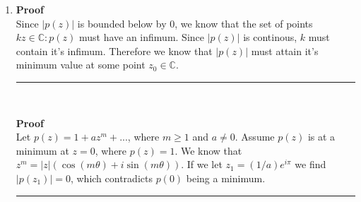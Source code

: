 \documentclass{article}%
\newcommand\abs[1]{\left|#1\right|}
\newenvironment{proof}[1][]{\begin{samepage}\textbf{Proof #1} \\ }{\\ \rule{0.5em}{0.5em} \end{samepage} \\}
\begin{document}
\begin{enumerate}
    \begin{proof}[$a_n = 1 + 1/2 + 1/3 + ... + 1/(n-1) - \ln{n}, n \geq 1$ is increasing]
        Let $n \geq 1$
        \begin{eqnarray*}
            a_n &=& 1 + 1/2 + 1/3 + ... 1/(n-1) - \ln{n} \\
                &=& \sum\limits_{i=1}^{n-1}\left(\frac{1}{i}\right)-\ln{n} \\
            a_{n+1}-a_{n} &=& \sum\limits_{i=1}^{n}\left(\frac{1}{i}\right)-\ln(n+1) - \sum\limits_{i=1}^{n-1}\left(\frac{1}{i}\right)+\ln(n) \\
                          &=& \frac{1}{n} - \ln(n+1) + \ln(n) = \frac{1}{n} + \ln{\frac{n}{n+1}} \\
                          &>& 0
        \end{eqnarray*}
    \end{proof}
    \begin{proof}[$a_n$ $b_n$ converge to the same limit]
        The defintion, $a_n = b_n - 1/n \implies b_n - a_n = 1/n$. Since $1/n$ approaches $0$ as $n$ approaces infinity, $a_n$ and $b_n$ must
        approach the same value.  Since $a_n$ is increasing while $b_n$ is decreasing we get that the two sequences converge to a finite number
        via the squeeze therom.
    \end{proof}
    \begin{proof}[$ 0.5 < \gamma < 0.6$]
        Since $a_n$ is increasing, and $a_7 \approx 0.5041 > 0.5$, $\gamma > 0.5$, and since $b_n$ is decreasing, and $b_{50} \approx 0.587182 < 0.6$,
        $\gamma < 0.6$
    \end{proof}
    \setcounter{enumi}{18}
    \item %
    \begin{proof}
        Since $\abs{p(z)}$ is bounded below by $0$,  we know that the set of points $k {z\in\mathbb{C} : p(z)}$ must have an infimum. 
        Since $\abs{p(z)}$ is continous, $k$ must contain it's infimum. Therefore we know that $\abs{p(z)}$ must attain it's minimum value at some point
        $z_0 \in \mathbb{C}$.
    \end{proof}
    \begin{proof}
        Let $p(z) = 1 + a z^m  +...$, where $m \geq 1$ and $a \neq 0$. 
        Assume $p(z)$ is at a minimum at $z=0$, where $p(z) = 1$.
        We know that $z^m = \abs{z} (\cos(m \theta) + i \sin(m \theta))$.  If we let $z_1 = (1/a)e^{i \pi}$ we find $\abs{p(z_1)} = 0$,
        which contradicts $p(0)$ being a minimum.
    \end{proof}
\end{enumerate}
\end{document}
